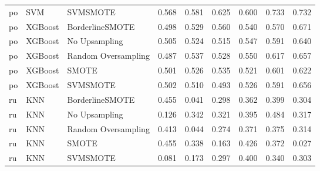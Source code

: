 \begin{tabular}{lllllllll}
      po &                          SVM &            SVMSMOTE & 0.568 &                     0.581 &                 0.625 &                  0.600 &                                   0.733 &     0.732 \\
      po &                      XGBoost &     BorderlineSMOTE & 0.498 &                     0.529 &                 0.560 &                  0.540 &                                   0.570 &     0.671 \\
      po &                      XGBoost &       No Upsampling & 0.505 &                     0.524 &                 0.515 &                  0.547 &                                   0.591 &     0.640 \\
      po &                      XGBoost & Random Oversampling & 0.487 &                     0.537 &                 0.528 &                  0.550 &                                   0.617 &     0.657 \\
      po &                      XGBoost &               SMOTE & 0.501 &                     0.526 &                 0.535 &                  0.521 &                                   0.601 &     0.622 \\
      po &                      XGBoost &            SVMSMOTE & 0.502 &                     0.510 &                 0.493 &                  0.526 &                                   0.591 &     0.656 \\
      ru &                          KNN &     BorderlineSMOTE & 0.455 &                     0.041 &                 0.298 &                  0.362 &                                   0.399 &     0.304 \\
      ru &                          KNN &       No Upsampling & 0.126 &                     0.342 &                 0.321 &                  0.395 &                                   0.484 &     0.317 \\
      ru &                          KNN & Random Oversampling & 0.413 &                     0.044 &                 0.274 &                  0.371 &                                   0.375 &     0.314 \\
      ru &                          KNN &               SMOTE & 0.455 &                     0.338 &                 0.163 &                  0.426 &                                   0.372 &     0.027 \\
      ru &                          KNN &            SVMSMOTE & 0.081 &                     0.173 &                 0.297 &                  0.400 &                                   0.340 &     0.303 \\

\end{tabular}
